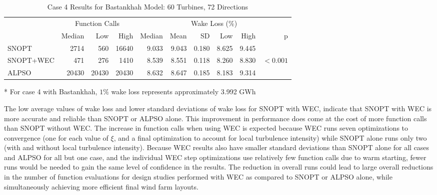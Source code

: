 \documentclass{jpconf}
\begin{document}
\begin{table}
	\centering
	\caption{Case 4 Results for Bastankhah Model: 60 Turbines, 72 Directions}
	\label{tab:case4}
	\begin{threeparttable}
	\begin{tabular}{lrrrrrrrrr}
		\toprule
		{} & \multicolumn{3}{c}{Function Calls} & \multicolumn{6}{c}{Wake Loss (\%)\tnote{*}} \\
		\cmidrule(lr){2-4} \cmidrule(lr){5-10}
		{} &         Median &    Low &   High &        Median &  Mean &    SD &   Low &  High &          p \\
		\cmidrule(lr){2-4} \cmidrule(lr){5-10}
		SNOPT     &           2714 &    560 &  16640 &         9.033 & 9.043 & 0.180 & 8.625 & 9.445 &            \\
		SNOPT+WEC &            471 &    276 &   1410 &         8.539 & 8.551 & 0.118 & 8.260 & 8.830 &  $< 0.001$ \\
		ALPSO     &          20430 &  20430 &  20430 &         8.632 & 8.647 & 0.185 & 8.183 & 9.314 &            \\
		\bottomrule
	\end{tabular}
	\begin{tablenotes}
		\item[*] For case 4 with Bastankhah, $1\%$ wake loss represents approximately 3.992 GWh
	\end{tablenotes}
	\end{threeparttable}
\end{table}

The low average values of wake loss and lower standard deviations of wake loss for SNOPT with WEC, indicate that SNOPT with WEC is more accurate and reliable than SNOPT or ALPSO alone. This improvement in performance does come at the cost of more function calls than SNOPT without WEC. The increase in function calls when using WEC is expected because WEC runs seven optimizations to convergence (one for each value of $\xi$, and a final optimization to account for local turbulence intensity) while SNOPT alone runs only two (with and without local turbulence intensity). Because WEC results also have smaller standard deviations than SNOPT alone for all cases and ALPSO for all but one case, and the individual WEC step optimizations use relatively few function calls due to warm starting, fewer runs would be needed to gain the same level of confidence in the results. The reduction in overall runs could lead to large overall reductions in the number of function evaluations for design studies performed with WEC as compared to SNOPT or ALPSO alone, while simultaneously achieving more efficient final wind farm layouts.
\end{document}
